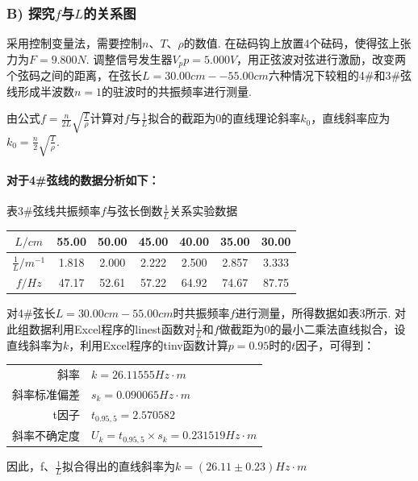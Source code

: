 \documentclass[UTF8]{ctexart}
\begin{document}
\subsubsection*{B) 探究$f$与$L$的关系图}
采用控制变量法，需要控制$n$、$T$、$\rho$的数值. 在砝码钩上放置4个砝码，使得弦上张力为$F = 9.800N$. 调整信号发生器$V_pp = 5.000V$，用正弦波对弦进行激励，改变两个弦码之间的距离，在弦长$L = 30.00cm--55.00cm$六种情况下较粗的4\#和3\#弦线形成半波数$n = 1$的驻波时的共振频率进行测量.\par
由公式${f = \frac{n}{2L}\sqrt{\frac{T}{\rho}}}$计算对$f$与$\frac{1}{L}$拟合的截距为0的直线理论斜率$k_0$，直线斜率应为$k_0=\frac{n}{2}\sqrt{\frac{T}{\rho}}$.



\paragraph{对于4\#弦线的数据分析如下：}
\begin{center}
{\kaishu 表3\#弦线共振频率$f$与弦长倒数$\frac{1}{L}$关系实验数据}
\begin{tabular}{|c|c|c|c|c|c|c|}
\hline
	$L/cm$&55.00&50.00&45.00&40.00&35.00&30.00\\
\hline
	$\frac{1}{L}/m^{-1}$&1.818&2.000&2.222&2.500&2.857&3.333\\
\hline
	{$f/Hz$}&{47.17}&{52.61}&{57.22}&{64.92}&{74.67}&{87.75}\\
\hline
\end{tabular}
\end{center}
\par 对4\#弦长${L} = 30.00cm - 55.00cm$时共振频率$f$进行测量，所得数据如表3所示. 对此组数据利用Excel程序的linest函数对$\frac{1}{L}$和$f$做截距为0的最小二乘法直线拟合，设直线斜率为$k$，利用Excel程序的tinv函数计算$p = 0.95$时的$t$因子，可得到：\par
\begin{center}\begin{tabular}{r l}
{斜率}& {$k=26.11555Hz\cdot m$}\\
{斜率标准偏差}& {$s_k=0.090065Hz\cdot m$}\\
{t因子}& {$t_{0.95,5}=2.570582$}\\
{斜率不确定度}& {$U_k=t_{0.95,5}\times s_k = 0.231519Hz\cdot m$}
\end{tabular}\end{center}
因此，f、$\frac{1}{L}$拟合得出的直线斜率为$k=(26.11\pm0.23)Hz\cdot m$\par
\end{document}

